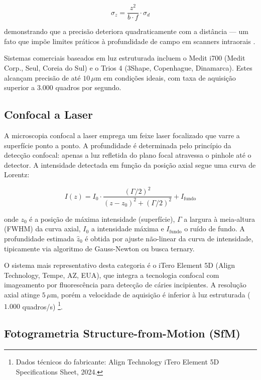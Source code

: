 \begin{equation}
\label{eq:incerteza-tria}
\sigma_z = \frac{z^2}{b \cdot f} \cdot \sigma_d
\end{equation}

demonstrando que a precisão deteriora quadraticamente com a distância — um fato que impõe limites práticos à profundidade de campo em scanners intraorais \cite{revilla2020intraoral}.

Sistemas comerciais baseados em luz estruturada incluem o Medit i700 (Medit Corp., Seul, Coreia do Sul) e o Trios 4 (3Shape, Copenhague, Dinamarca). Estes alcançam precisão de até $10\,\mu\text{m}$ em condições ideais, com taxa de aquisição superior a $3.000$ quadros por segundo.

\subsection{Confocal a Laser}
\label{subsec:confocal-laser}

A microscopia confocal a laser emprega um feixe laser focalizado que varre a superfície ponto a ponto. A profundidade é determinada pelo princípio da detecção confocal: apenas a luz refletida do plano focal atravessa o pinhole até o detector. A intensidade detectada em função da posição axial segue uma curva de Lorentz:

\begin{equation}
\label{eq:confocal}
I(z) = I_0 \cdot \frac{(\Gamma/2)^2}{(z - z_0)^2 + (\Gamma/2)^2} + I_{\text{fundo}}
\end{equation}

onde $z_0$ é a posição de máxima intensidade (superfície), $\Gamma$ a largura à meia-altura (FWHM) da curva axial, $I_0$ a intensidade máxima e $I_{\text{fundo}}$ o ruído de fundo. A profundidade estimada $\hat{z}_0$ é obtida por ajuste não-linear da curva de intensidade, tipicamente via algoritmo de Gauss-Newton ou busca ternary.

O sistema mais representativo desta categoria é o iTero Element 5D (Align Technology, Tempe, AZ, EUA), que integra a tecnologia confocal com imageamento por fluorescência para detecção de cáries incipientes. A resolução axial atinge $5\,\mu\text{m}$, porém a velocidade de aquisição é inferior à luz estruturada (~$1.000$ quadros/s) \footnote{Dados técnicos do fabricante: Align Technology iTero Element 5D Specifications Sheet, 2024.}.

\subsection{Fotogrametria Structure-from-Motion (SfM)}
\label{subsec:sfm-fotogrametria}

